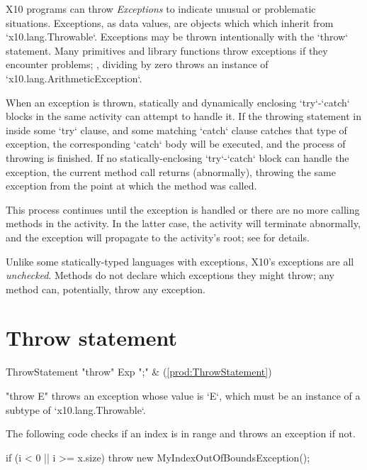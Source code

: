 X10 programs can throw {\em Exceptions} to indicate unusual or problematic
situations.  Exceptions, as data values, are objects which which inherit from
\xcd`x10.lang.Throwable`.    Exceptions may be thrown intentionally with the
\xcd`throw` statement. Many primitives and library functions throw exceptions
if they encounter problems; \eg, dividing by zero throws an instance of
\xcd`x10.lang.ArithmeticException`. 

When an exception is thrown, statically and dynamically enclosing
\xcd`try`-\xcd`catch` blocks in the same activity can attempt to handle it.   If the throwing
statement in inside some \xcd`try` clause, and some matching \xcd`catch`
clause catches that type of exception, the corresponding \xcd`catch` body will
be executed, and the process of throwing is finished.  
If no statically-enclosing \xcd`try`-\xcd`catch` block can handle the
exception, the current method call returns (abnormally), throwing the same
exception from the point at which the method was called.  

This process continues until the exception is handled or there are no more
calling methods in the activity. In the latter case, the activity will
terminate abnormally, and the exception will propagate to the activity's root;
see  for details.

Unlike some statically-typed languages with exceptions, X10's exceptions are
all {\em unchecked}. Methods do not declare which exceptions they might throw;
any method can, potentially, throw any exception.


\section{Throw statement}

\begin{bbgrammar}
      ThrowStatement \: \xcd"throw" Exp \xcd";" & (\ref{prod:ThrowStatement}) \\
\end{bbgrammar}

\xcd"throw E" throws an exception whose value is \xcd`E`, which must be an
instance of a subtype of \xcd`x10.lang.Throwable`. 

\begin{ex}
The following code checks if an index is in range and
throws an exception if not.

\begin{xten}
if (i < 0 || i >= x.size)
    throw new MyIndexOutOfBoundsException();
\end{xten}
\end{ex}

